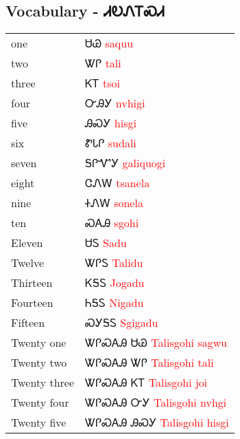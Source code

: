 \newpage\subsection{Vocabulary - ᏗᎧᏁᎢᏍᏗ 
}
\begin{minipage}{\linewidth}
\begin{tabular}{p{5cm} p{9cm}}
one & ᏌᏊ 
 \newline \textcolor{red}{saquu}\\
two & ᏔᎵ 
 \newline \textcolor{red}{tali}\\
three & ᏦᎢ 
 \newline \textcolor{red}{tsoi}\\
four & ᏅᎯᎩ 
 \newline \textcolor{red}{nvhigi}\\
five & ᎯᏍᎩ 
 \newline \textcolor{red}{hisgi}\\
six & ᏑᏓᎵ 
 \newline \textcolor{red}{sudali}\\
seven & ᎦᎵᏉᎩ 
 \newline \textcolor{red}{galiquogi}\\
eight & ᏣᏁᎳ 
 \newline \textcolor{red}{tsanela}\\
nine & ᏐᏁᎳ 
 \newline \textcolor{red}{sonela}\\
ten & ᏍᎪᎯ 
 \newline \textcolor{red}{sgohi}\\
Eleven & ᏌᏚ 
 \newline \textcolor{red}{Sadu}\\
Twelve & ᏔᎵᏚ 
 \newline \textcolor{red}{Talidu}\\
Thirteen & ᏦᎦᏚ 
 \newline \textcolor{red}{Jogadu}\\
Fourteen & ᏂᎦᏚ 
 \newline \textcolor{red}{Nigadu}\\
Fifteen & ᏍᎩᎦᏚ 
 \newline \textcolor{red}{Sgigadu}\\
Twenty one & ᏔᎵᏍᎪᎯ ᏌᏊ 
 \newline \textcolor{red}{Talisgohi sagwu}\\
Twenty two & ᏔᎵᏍᎪᎯ ᏔᎵ 
 \newline \textcolor{red}{Talisgohi tali}\\
Twenty three & ᏔᎵᏍᎪᎯ ᏦᎢ 
 \newline \textcolor{red}{Talisgohi joi}\\
Twenty four & ᏔᎵᏍᎪᎯ ᏅᎩ 
 \newline \textcolor{red}{Talisgohi nvhgi}\\
Twenty five & ᏔᎵᏍᎪᎯ ᎯᏍᎩ 
 \newline \textcolor{red}{Talisgohi hisgi}\\
\end{tabular}
\end{minipage}

